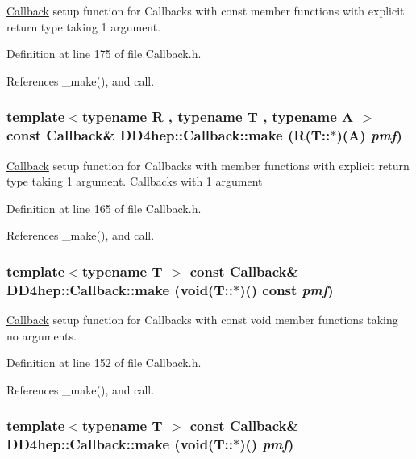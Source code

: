 \hyperlink{class_d_d4hep_1_1_callback}{Callback} setup function for Callbacks with const member functions with explicit return type taking 1 argument. 

Definition at line 175 of file Callback.h.

References \_\-make(), and call.\hypertarget{class_d_d4hep_1_1_callback_a04e19b0d13aa0fe1728326d79d204620}{
\subsubsection[{make}]{\setlength{\rightskip}{0pt plus 5cm}template$<$typename R , typename T , typename A $>$ const {\bf Callback}\& DD4hep::Callback::make (R(T::$\ast$)(A) {\em pmf})}}
\label{class_d_d4hep_1_1_callback_a04e19b0d13aa0fe1728326d79d204620}


\hyperlink{class_d_d4hep_1_1_callback}{Callback} setup function for Callbacks with member functions with explicit return type taking 1 argument. Callbacks with 1 argument 

Definition at line 165 of file Callback.h.

References \_\-make(), and call.\hypertarget{class_d_d4hep_1_1_callback_aea1f37de334b82531ae96e582c957c6c}{
\subsubsection[{make}]{\setlength{\rightskip}{0pt plus 5cm}template$<$typename T $>$ const {\bf Callback}\& DD4hep::Callback::make (void(T::$\ast$)() const  {\em pmf})}}
\label{class_d_d4hep_1_1_callback_aea1f37de334b82531ae96e582c957c6c}


\hyperlink{class_d_d4hep_1_1_callback}{Callback} setup function for Callbacks with const void member functions taking no arguments. 

Definition at line 152 of file Callback.h.

References \_\-make(), and call.\hypertarget{class_d_d4hep_1_1_callback_a87a6d5252f2275f57c7803f9f493e20e}{
\subsubsection[{make}]{\setlength{\rightskip}{0pt plus 5cm}template$<$typename T $>$ const {\bf Callback}\& DD4hep::Callback::make (void(T::$\ast$)() {\em pmf})}}
\label{class_d_d4hep_1_1_callback_a87a6d5252f2275f57c7803f9f493e20e}


